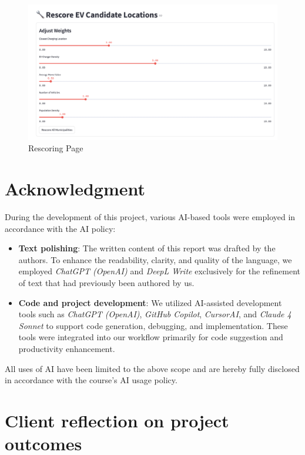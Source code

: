 \documentclass{article}
\begin{document}
\begin{figure}[H]
	\centering
	\includegraphics[width=0.75\linewidth]{rescore_view.png}
	\caption{Rescoring Page}
	\label{fig:rescore}
\end{figure}

\section*{Acknowledgment}

During the development of this project, various AI-based tools were employed in accordance with the AI policy:

\begin{itemize}
	\item \textbf{Text polishing}: The written content of this report was drafted by the authors. To enhance the readability, clarity, and quality of the language, we employed \textit{ChatGPT (OpenAI)} and \textit{DeepL Write} exclusively for the refinement of text that had previously been authored by us.

	\item \textbf{Code and project development}: We utilized AI-assisted development tools such as \textit{ChatGPT (OpenAI)}, \textit{GitHub Copilot}, \textit{CursorAI}, and \textit{Claude 4 Sonnet} to support code generation, debugging, and implementation. These tools were integrated into our workflow primarily for code suggestion and productivity enhancement.
\end{itemize}

All uses of AI have been limited to the above scope and are hereby fully disclosed in accordance with the course's AI usage policy.




\appendix

\section{Client reflection on project outcomes}
\end{document}

